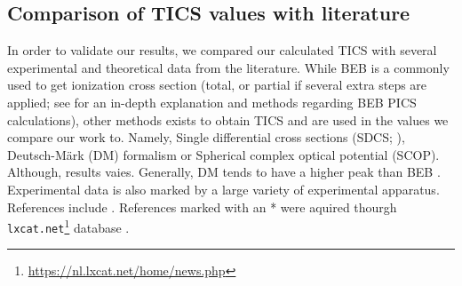 \documentclass[article,preview]{planetary}
\begin{document}

\subsection{Comparison of TICS values with literature}
In order to validate our results, we compared our calculated TICS with several experimental and theoretical data from the literature. While BEB is a commonly used to get ionization cross section (total, or partial if several extra steps are applied; see \cite{jesenekPartialIonisationCross2025} for an in-depth explanation and methods regarding BEB PICS calculations), other methods exists to obtain TICS and are used in the values we compare our work to. Namely, Single differential cross sections (SDCS; \cite{kumarElectronIonizationCross2014}), Deutsch-Märk (DM) formalism or Spherical complex optical potential (SCOP). Although, results vaies. Generally, DM tends to have a higher peak than BEB \parencite{huberTotalPartialElectron2019}. Experimental data is also marked by a large variety of experimental apparatus. \\
References include \textcite{rappTotalCrossSections1965,kumarElectronIonizationCross2014,gravesEfficientCalculationElectron2021,raoElectronImpactIonization1993,basnerDissociativeIonizationSilane1997,vinodkumarElectronImpactTotal2011,hayashiElectronCollisionCrossSections1987,kurachiElectronCollisionCross1989,itikawaCrossSectionsElectron2015,khanAbsolutePartialTotal2024,zhouTotalElectronIonization2019,markIonizationPhosphineDeuterated1977,kumarElectronIonizationCross2014,orientElectronImpactIonisation1987,kaurElectronInducedIonization2015,krishnakumarIonizationCrossSections1995,chathamTotalPartialElectron1984,nishimuraTotalElectronImpact1994,tateEfficienciesIonizationIonization1932,gaudinDeterminationsAbsoluesSections1967,nakamuraElectronSwarmParameters2010,fresnetDynamicsBreakdownDelay2002,jiaoElectronImpactIonization2007,kumarTheoreticalStudyElectron2026,vacherElectronImpactIonization2007,singhElectronScatteringCross2020,gachesAstrochemistryLowenergyElectron2024,linstromNISTChemistryWebBook2001,syageSpectroscopyDynamicsJetcooled1992,raoCrossSectionsDirect1991, aliIonizationCrossSections2008,uddinElectronImpactTotal2018,hudsonAbsoluteElectronImpact2003,vinodkumarElectronImpactTotal2010,aliIonizationCrossSections2008,sharmaAbsoluteIonizationCross2020,hudsonAbsoluteElectronImpact2003,vallanceAbsoluteElectronImpact1997,vinodkumarElectronImpactCalculations2011,vinodkumarElectronImpactCalculations2008}. References marked with an * were aquired thourgh \verb|lxcat.net|\footnote{\url{https://nl.lxcat.net/home/news.php}} database \parencite{pancheshnyiLXCatProjectElectron2012,pitchfordLXCatOpenAccessWebBased2017}.
\end{document}
